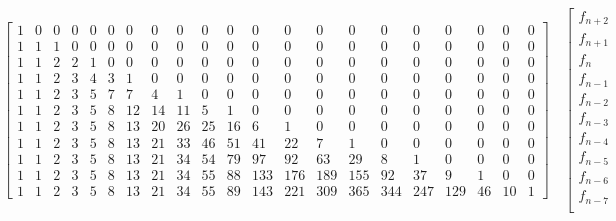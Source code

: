 \begin{sidewaystable}
    \begin{displaymath}
        \left[
            \begin{array}{ccccccccccccccccccccc}
            1 & 0 & 0 & 0 & 0 & 0 & 0 & 0 & 0 & 0 & 0 & 0 & 0 & 0 & 0 & 0 & 0 & 0 & 0 & 0 & 0\\
            1 & 1 & 1 & 0 & 0 & 0 & 0 & 0 & 0 & 0 & 0 & 0 & 0 & 0 & 0 & 0 & 0 & 0 & 0 & 0 & 0\\
            1 & 1 & 2 & 2 & 1 & 0 & 0 & 0 & 0 & 0 & 0 & 0 & 0 & 0 & 0 & 0 & 0 & 0 & 0 & 0 & 0\\
            1 & 1 & 2 & 3 & 4 & 3 & 1 & 0 & 0 & 0 & 0 & 0 & 0 & 0 & 0 & 0 & 0 & 0 & 0 & 0 & 0\\
            1 & 1 & 2 & 3 & 5 & 7 & 7 & 4 & 1 & 0 & 0 & 0 & 0 & 0 & 0 & 0 & 0 & 0 & 0 & 0 & 0\\
            1 & 1 & 2 & 3 & 5 & 8 & 12 & 14 & 11 & 5 & 1 & 0 & 0 & 0 & 0 & 0 & 0 & 0 & 0 & 0 & 0\\
            1 & 1 & 2 & 3 & 5 & 8 & 13 & 20 & 26 & 25 & 16 & 6 & 1 & 0 & 0 & 0 & 0 & 0 & 0 & 0 & 0\\
            1 & 1 & 2 & 3 & 5 & 8 & 13 & 21 & 33 & 46 & 51 & 41 & 22 & 7 & 1 & 0 & 0 & 0 & 0 & 0 & 0\\
            1 & 1 & 2 & 3 & 5 & 8 & 13 & 21 & 34 & 54 & 79 & 97 & 92 & 63 & 29 & 8 & 1 & 0 & 0 & 0 & 0\\
            1 & 1 & 2 & 3 & 5 & 8 & 13 & 21 & 34 & 55 & 88 & 133 & 176 & 189 & 155 & 92 & 37 & 9 & 1 & 0 & 0\\
            1 & 1 & 2 & 3 & 5 & 8 & 13 & 21 & 34 & 55 & 89 & 143 & 221 & 309 & 365 & 344 & 247 & 129 & 46 & 10 & 1
            \end{array}
            \right]  \quad %
            \left[
                \begin{array}{c}
                    f_{n + 2}\\
                    f_{n + 1}\\
                    f_{n}\\
                    f_{n - 1}\\
                    f_{n - 2}\\
                    f_{n - 3}\\
                    f_{n - 4}\\
                    f_{n - 5}\\
                    f_{n - 6}\\
                    f_{n - 7}\\

\end{array}
\end{displaymath}
\end{sidewaystable}
